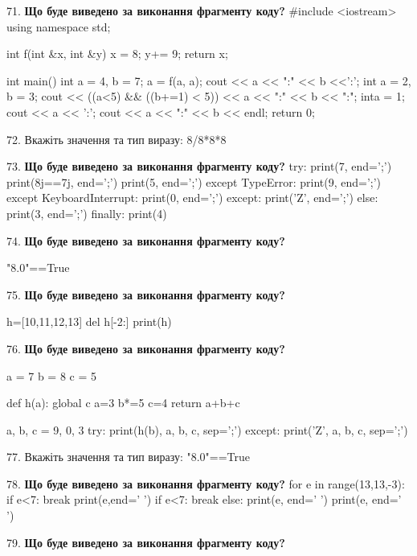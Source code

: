 \documentclass[11pt]{article}
\begin{document}
\par\vspace{5mm}
71. \textbf{Що буде виведено за виконання фрагменту коду?}
#include <iostream>
using namespace std;

int f(int &x, int &y){
    x = 8;
    y+= 9;
    return x;
}

int main(){
    int a = 4, b = 7;
    a = f(a, a);
    cout << a << ":" << b <<':';
    {
        int a = 2, b = 3;
        cout << ((a<5) && ((b+=1) < 5))
             << a << ":" << b << ":";
    }
    {
        inta = 1;
        cout << a << ':';
    }
    cout << a << ":" << b << endl;
    return 0;
}

\par\vspace{5mm}
72. 
Вкажіть значення та тип виразу:
8/8*8*8
\par\vspace{5mm}
73. \textbf{Що буде виведено за виконання фрагменту коду?}
try:
    print(7, end=';')
    print(8j==7j, end=';')
    print(5, end=';')
except TypeError:
    print(9, end=';')
except KeyboardInterrupt:
    print(0, end=';')
except:
    print('Z', end=';')
else:
    print(3, end=';')
finally:
    print(4)
\par\vspace{5mm}
74. \textbf{Що буде виведено за виконання фрагменту коду?}

"8.0"==True
\par\vspace{5mm}
75. \textbf{Що буде виведено за виконання фрагменту коду?}

h=[10,11,12,13]
del h[-2:]
print(h)

\par\vspace{5mm}
76. \textbf{Що буде виведено за виконання фрагменту коду?}

a = 7
b = 8
c = 5

def h(a):
global c    a=3
    b*=5
    c=4
    return a+b+c

a, b, c = 9, 0, 3
try:
    print(h(b), a, b, c, sep=';')
except:
    print('Z', a, b, c, sep=';')
\par\vspace{5mm}
77. 
Вкажіть значення та тип виразу:
"8.0"==True
\par\vspace{5mm}
78. \textbf{Що буде виведено за виконання фрагменту коду?}
for e in range(13,13,-3):
    if e<7:
        break
        print(e,end=' ')
    if e<7:
        break
else:
    print(e, end=' ')
print(e, end=' ')
\par\vspace{5mm}
79. \textbf{Що буде виведено за виконання фрагменту коду?}
\end{document}
